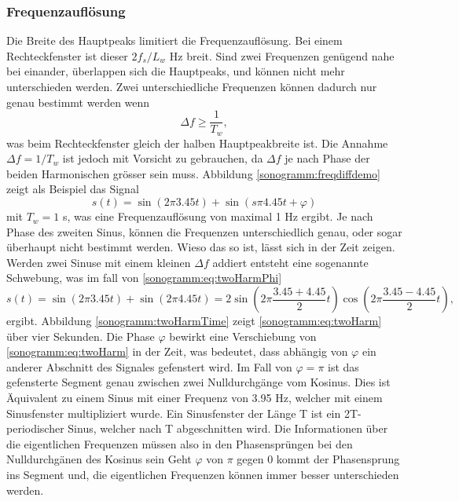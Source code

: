 \subsubsection{Frequenzauflösung}
Die Breite des Hauptpeaks limitiert die Frequenzauflösung.
Bei einem Rechteckfenster ist dieser $2f_s/L_w$ Hz breit.
Sind zwei Frequenzen genügend nahe bei einander, überlappen sich die Hauptpeaks, und können
nicht mehr unterschieden werden. 
Zwei unterschiedliche Frequenzen können dadurch nur genau bestimmt werden wenn
\begin{equation}
    \Delta f \geq \frac{1}{T_w},
\end{equation}
was beim Rechteckfenster gleich der halben Hauptpeakbreite ist.
Die Annahme $\Delta f = 1/T_w$ ist jedoch mit Vorsicht zu gebrauchen, da $\Delta f$ je nach 
Phase der beiden Harmonischen grösser sein muss.
Abbildung \ref{sonogramm:freqdiffdemo} zeigt als Beispiel das Signal
\begin{equation}
    s(t) = \sin(2\pi 3.45 t ) + \sin (s\pi 4.45 t + \varphi)
    \label{sonogramm:eq:twoHarmPhi}
\end{equation}
mit $T_w = 1$ s, was eine Frequenzauflösung von maximal 1 Hz ergibt.
Je nach Phase des zweiten Sinus, können die Frequenzen unterschiedlich genau, oder sogar überhaupt nicht
bestimmt werden.
Wieso das so ist, lässt sich in der Zeit zeigen.
Werden zwei Sinuse mit einem kleinen $\Delta f$ addiert entsteht eine sogenannte Schwebung,
was im fall von \eqref{sonogramm:eq:twoHarmPhi}
\begin{equation}
    s(t) = \sin(2\pi 3.45 t ) + \sin (2\pi 4.45 t) = 2 \sin(2 \pi \frac{3.45 + 4.45}{2}t)
    \cos(2 \pi  \frac{3.45 - 4.45}{2} t),
\label{sonogramm:eq:twoHarm}
\end{equation}
ergibt.
Abbildung \ref{sonogramm:twoHarmTime} zeigt \eqref{sonogramm:eq:twoHarm} über vier Sekunden.
Die Phase $\varphi$ bewirkt eine Verschiebung von \eqref{sonogramm:eq:twoHarm} in der Zeit, 
was bedeutet, dass abhängig von $\varphi$ ein anderer Abschnitt des Signales gefenstert wird.
Im Fall von $\varphi = \pi$ ist das gefensterte Segment genau zwischen zwei Nulldurchgänge
vom Kosinus.
Dies ist Äquivalent zu einem Sinus mit einer Frequenz von 3.95 Hz, welcher mit einem 
Sinusfenster multipliziert wurde. 
Ein Sinusfenster der Länge T ist ein 2T-periodischer Sinus, welcher nach T abgeschnitten wird.
Die Informationen über die eigentlichen Frequenzen müssen also in den Phasensprüngen bei den 
Nulldurchgänen des Kosinus sein
Geht $\varphi$ von $\pi$ gegen 0 kommt der Phasensprung ins Segment und, die eigentlichen Frequenzen
können immer besser unterschieden werden.

